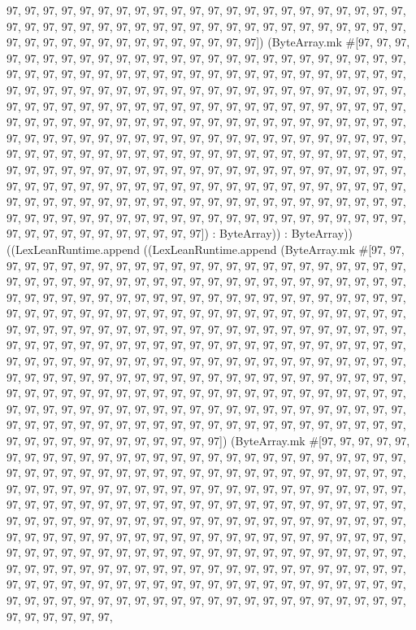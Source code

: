 \documentclass[11pt]{article}
\begin{document}
97, 97, 97, 97, 97, 97, 97, 97, 97, 97, 97, 97, 97, 97, 97, 97, 97, 97, 97, 97, 97, 97, 97, 97, 97, 97, 97, 97, 97, 97, 97, 97, 97, 97, 97, 97, 97, 97, 97, 97, 97, 97, 97, 97, 97, 97, 97, 97, 97, 97, 97, 97, 97, 97, 97, 97, 97, 97]) (ByteArray.mk \#[97, 97, 97, 97, 97, 97, 97, 97, 97, 97, 97, 97, 97, 97, 97, 97, 97, 97, 97, 97, 97, 97, 97, 97, 97, 97, 97, 97, 97, 97, 97, 97, 97, 97, 97, 97, 97, 97, 97, 97, 97, 97, 97, 97, 97, 97, 97, 97, 97, 97, 97, 97, 97, 97, 97, 97, 97, 97, 97, 97, 97, 97, 97, 97, 97, 97, 97, 97, 97, 97, 97, 97, 97, 97, 97, 97, 97, 97, 97, 97, 97, 97, 97, 97, 97, 97, 97, 97, 97, 97, 97, 97, 97, 97, 97, 97, 97, 97, 97, 97, 97, 97, 97, 97, 97, 97, 97, 97, 97, 97, 97, 97, 97, 97, 97, 97, 97, 97, 97, 97, 97, 97, 97, 97, 97, 97, 97, 97, 97, 97, 97, 97, 97, 97, 97, 97, 97, 97, 97, 97, 97, 97, 97, 97, 97, 97, 97, 97, 97, 97, 97, 97, 97, 97, 97, 97, 97, 97, 97, 97, 97, 97, 97, 97, 97, 97, 97, 97, 97, 97, 97, 97, 97, 97, 97, 97, 97, 97, 97, 97, 97, 97, 97, 97, 97, 97, 97, 97, 97, 97, 97, 97, 97, 97, 97, 97, 97, 97, 97, 97, 97, 97, 97, 97, 97, 97, 97, 97, 97, 97, 97, 97, 97, 97, 97, 97, 97, 97, 97, 97, 97, 97, 97, 97, 97, 97, 97, 97, 97, 97, 97, 97, 97, 97, 97, 97, 97, 97, 97, 97, 97, 97, 97, 97, 97, 97, 97, 97, 97, 97, 97, 97, 97, 97, 97, 97]) : ByteArray)) : ByteArray)) ((LexLeanRuntime.append ((LexLeanRuntime.append (ByteArray.mk \#[97, 97, 97, 97, 97, 97, 97, 97, 97, 97, 97, 97, 97, 97, 97, 97, 97, 97, 97, 97, 97, 97, 97, 97, 97, 97, 97, 97, 97, 97, 97, 97, 97, 97, 97, 97, 97, 97, 97, 97, 97, 97, 97, 97, 97, 97, 97, 97, 97, 97, 97, 97, 97, 97, 97, 97, 97, 97, 97, 97, 97, 97, 97, 97, 97, 97, 97, 97, 97, 97, 97, 97, 97, 97, 97, 97, 97, 97, 97, 97, 97, 97, 97, 97, 97, 97, 97, 97, 97, 97, 97, 97, 97, 97, 97, 97, 97, 97, 97, 97, 97, 97, 97, 97, 97, 97, 97, 97, 97, 97, 97, 97, 97, 97, 97, 97, 97, 97, 97, 97, 97, 97, 97, 97, 97, 97, 97, 97, 97, 97, 97, 97, 97, 97, 97, 97, 97, 97, 97, 97, 97, 97, 97, 97, 97, 97, 97, 97, 97, 97, 97, 97, 97, 97, 97, 97, 97, 97, 97, 97, 97, 97, 97, 97, 97, 97, 97, 97, 97, 97, 97, 97, 97, 97, 97, 97, 97, 97, 97, 97, 97, 97, 97, 97, 97, 97, 97, 97, 97, 97, 97, 97, 97, 97, 97, 97, 97, 97, 97, 97, 97, 97, 97, 97, 97, 97, 97, 97, 97, 97, 97, 97, 97, 97, 97, 97, 97, 97, 97, 97, 97, 97, 97, 97, 97, 97, 97, 97, 97, 97, 97, 97, 97, 97, 97, 97, 97, 97, 97, 97, 97, 97, 97, 97, 97, 97, 97, 97, 97, 97, 97, 97, 97, 97, 97, 97]) (ByteArray.mk \#[97, 97, 97, 97, 97, 97, 97, 97, 97, 97, 97, 97, 97, 97, 97, 97, 97, 97, 97, 97, 97, 97, 97, 97, 97, 97, 97, 97, 97, 97, 97, 97, 97, 97, 97, 97, 97, 97, 97, 97, 97, 97, 97, 97, 97, 97, 97, 97, 97, 97, 97, 97, 97, 97, 97, 97, 97, 97, 97, 97, 97, 97, 97, 97, 97, 97, 97, 97, 97, 97, 97, 97, 97, 97, 97, 97, 97, 97, 97, 97, 97, 97, 97, 97, 97, 97, 97, 97, 97, 97, 97, 97, 97, 97, 97, 97, 97, 97, 97, 97, 97, 97, 97, 97, 97, 97, 97, 97, 97, 97, 97, 97, 97, 97, 97, 97, 97, 97, 97, 97, 97, 97, 97, 97, 97, 97, 97, 97, 97, 97, 97, 97, 97, 97, 97, 97, 97, 97, 97, 97, 97, 97, 97, 97, 97, 97, 97, 97, 97, 97, 97, 97, 97, 97, 97, 97, 97, 97, 97, 97, 97, 97, 97, 97, 97, 97, 97, 97, 97, 97, 97, 97, 97, 97, 97, 97, 97, 97, 97, 97, 97, 97, 97, 97, 97, 97, 97, 97, 97, 97, 97, 97, 97, 97, 97, 97, 97, 97, 97, 97, 97, 97, 97, 97, 97, 97, 97, 97, 97, 97, 97, 97, 97, 97, 97, 97, 97, 97, 97, 97, 97, 97, 97, 97, 97, 97, 97, 97, 97, 97, 97, 
\end{document}
